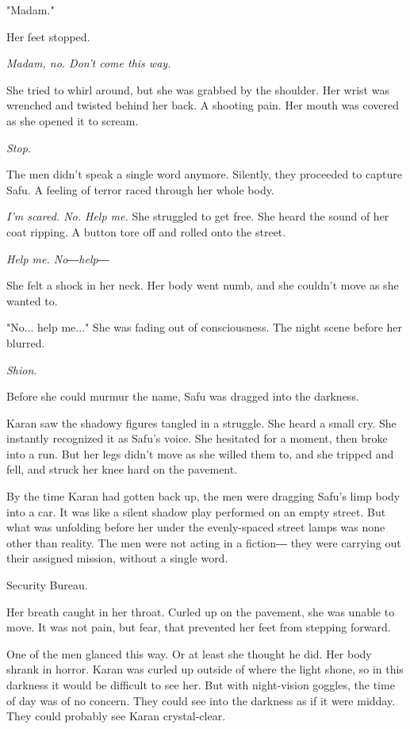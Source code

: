 "Madam."

Her feet stopped.

\emph{Madam, no. Don't come this way.}

She tried to whirl around, but she was grabbed by the shoulder. Her
wrist was wrenched and twisted behind her back. A shooting pain. Her
mouth was covered as she opened it to scream.

\emph{Stop.}

The men didn't speak a single word anymore. Silently, they proceeded to
capture Safu. A feeling of terror raced through her whole body.

\emph{I'm scared. No. Help me.} She struggled to get free. She heard the sound
of her coat ripping. A button tore off and rolled onto the street.

\emph{Help me. No―help―}

She felt a shock in her neck. Her body went numb, and she couldn't move
as she wanted to.

"No... help me..." She was fading out of consciousness. The night scene
before her blurred.

\emph{Shion.}

Before she could murmur the name, Safu was dragged into the darkness.

\myspace

Karan saw the shadowy figures tangled in a struggle. She heard a small
cry. She instantly recognized it as Safu's voice. She hesitated for a
moment, then broke into a run. But her legs didn't move as she willed
them to, and she tripped and fell, and struck her knee hard on the
pavement.

By the time Karan had gotten back up, the men were dragging Safu's limp
body into a car. It was like a silent shadow play performed on an empty
street. But what was unfolding before her under the evenly-spaced street
lamps was none other than reality. The men were not acting in a fiction―
they were carrying out their assigned mission, without a single word.

Security Bureau.

Her breath caught in her throat. Curled up on the pavement, she was
unable to move. It was not pain, but fear, that prevented her feet from
stepping forward.

One of the men glanced this way. Or at least she thought he did. Her
body shrank in horror. Karan was curled up outside of where the light
shone, so in this darkness it would be difficult to see her. But with
night-vision goggles, the time of day was of no concern. They could see
into the darkness as if it were midday. They could probably see Karan
crystal-clear.


